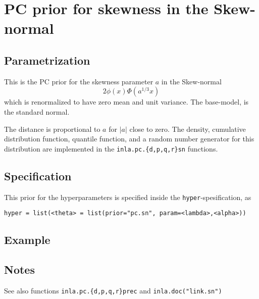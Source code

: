 \documentclass[a4paper,11pt]{article}
\begin{document}
\section*{PC prior for skewness in the Skew-normal}

\subsection*{Parametrization}
This is the PC prior for the skewness parameter $a$ in the Skew-normal 
\begin{displaymath}
    2\phi(x)\Phi(a^{1/3}x)
\end{displaymath}
which is renormalized to have zero mean and unit variance. The
base-model, is the standard normal. 

The distance is proportional to $a$ for $|a|$ close to zero. The
density, cumulative distribution function, quantile function, and a
random number generator for this distribution are implemented in the
\texttt{inla.pc.\{d,p,q,r\}sn} functions.

\subsection*{Specification}
This prior for the hyperparameters is specified inside the
\texttt{hyper}-spesification, as
\begin{center}
    \texttt{hyper = list(<theta> =
        list(prior="pc.sn", param=<lambda>,<alpha>))}
\end{center}

\subsection*{Example}

\subsection*{Notes}

See also functions \texttt{inla.pc.\{d,p,q,r\}prec} and
\texttt{inla.doc("link.sn")}
\end{document}
